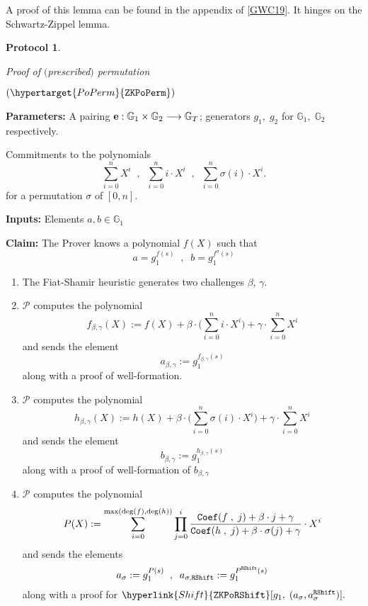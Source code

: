 \documentclass[11pt, lettersize, notitlepage, leqno, footskip=0.6cm]{article}
\newcommand{\lra}{\longrightarrow}
\newcommand{\mc}{\mathcal}
\newcommand{\mb}{\mathbb}
\newcommand{\be}{\beta}
\newcommand{\mP}{\mc{P}}
\newcommand{\vs}{\vspace{-0.15cm}}
\newcommand{\noin}{\noindent}
\newtheorem{Prot}[Thm]{Protocol}
\numberwithin{equation}{section}
\begin{document}
\noin A proof of this lemma can be found in the appendix of \hyperlink{Plonk}{[GWC19]}. It hinges on the Schwartz-Zippel lemma.



\vspace{2mm}




\begin{mdframed}
\begin{Prot} \hypertarget{Perm}{Proof of $($prescribed$)$ permutation} $(\hypertarget{PoPerm}{\tt{ZKPoPerm}})$ \end{Prot}  

\noin \textbf{Parameters:} A pairing ${\bf{e}}:\mb{G}_1\times \mb{G}_2\lra \mb{G}_T$; generators $g_1,\;g_2$ for $\mb{G}_1,\; \mb{G}_2$ respectively. \vspace{1mm}

\noin Commitments to the polynomials \vs $$\sum\limits_{i=0}^n X^i\;\;,\;\;\sum\limits_{i=0}^n i\cdot X^i\;\;,\;\;\sum\limits_{i=0}^n \sigma(i)\cdot X^i. $$ for a permutation $\sigma$ of $[0,n]$.


\noin \textbf{Inputs:} Elements $a, b \in \mb{G}_1$

\noin \textbf{Claim:} The Prover knows a polynomial $f(X)$ such that \vs $$ a = g_1^{f(s)}\;\;,\;\;b = g_1^{f^{\sigma}(s)} $$

\begin{enumerate}[wide, labelwidth=!, labelindent=0pt, itemsep=-0.2ex] 

\item The Fiat-Shamir heuristic generates two challenges $\beta$, $\gamma$.

\item $\mP$ computes the polynomial \vs $$ f_{\be,\gamma}(X):= f(X)+\be\cdot \big(\sum\limits_{i=0}^{n} i\cdot X^i\big)+\gamma\cdot \sum\limits_{i=0}^{n} X^i $$ and sends the element $$ a_{\be,\gamma}:= g_1^{f_{\be,\gamma}(s)}$$ along with a proof of well-formation.

\item $\mP$ computes the polynomial \vs $$ h_{\be,\gamma}(X):= h(X)+\be\cdot \big(\sum\limits_{i=0}^{n} \sigma(i)\cdot X^i\big)+\gamma\cdot \sum\limits_{i=0}^{n} X^i $$ and sends the element $$ b_{\be,\gamma}:= g_1^{h_{\be,\gamma}(s)}  $$ along with a proof of well-formation of $b_{\be,\gamma}$  

\item $\mP$ computes the polynomial \vs $$ P(X):= \sum\limits_{i=0}^{\max(\deg(f),\deg(h))} \prod\limits_{j=0}^i \frac{ {\tt{Coef}}(f\;,\;j) +\be\cdot j + \gamma }{ {\tt{Coef}}(h\;,\;j)+\be\cdot \sigma(j) + \gamma } \cdot X^i   $$ and sends the elements $$ a_{\sigma}:= g_1^{P(s)}\;\;,\;\;a_{\sigma,{\tt{RShift}}}:= g_1^{P^{{\tt{RShift}}}(s)} $$ along with a proof for $\hyperlink{Shift}{\tt{ZKPoRShift}}[g_1,\;(a_{\sigma}, a^{{\tt{RShift}}}_{\sigma})]. $


\end{enumerate}
\end{mdframed}
\end{document}
